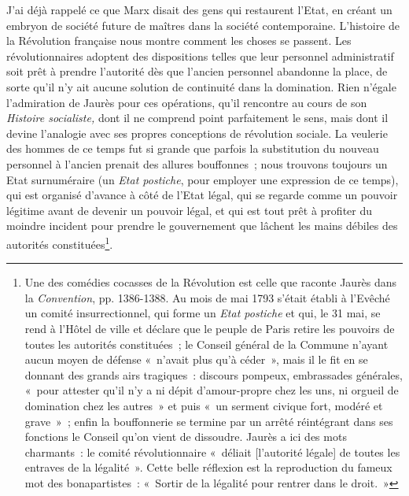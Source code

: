 \documentclass[french,twoside]{book} %
\begin{document}
J’ai déjà rappelé ce que Marx disait des gens qui restaurent l’Etat, en créant un embryon de société future de maîtres dans la société contemporaine. L’histoire de la Révolution française nous montre comment les choses se passent. Les révolutionnaires adoptent des dispositions telles que leur personnel administratif soit prêt à prendre l’autorité dès que l’ancien personnel abandonne la place, de sorte qu’il n’y ait aucune solution de continuité dans la domination. Rien n’égale l’admiration de Jaurès pour ces opérations, qu’il rencontre au cours de son \emph{Histoire socialiste,} dont il ne comprend point parfaitement le sens, mais dont il devine l’analogie avec ses propres conceptions de révolution sociale. La veulerie des hommes de ce temps fut si grande que parfois la substitution du nouveau personnel à l’ancien prenait des allures bouffonnes ; nous trouvons toujours un Etat surnuméraire (un \emph{Etat postiche}, pour employer une expression de ce temps), qui est organisé d’avance à côté  de l’Etat légal, qui se regarde comme un pouvoir légitime avant de devenir un pouvoir légal, et qui est tout prêt à profiter du moindre incident pour prendre le gouvernement que lâchent les mains débiles des autorités constituées\footnote{ \noindent Une des comédies cocasses de la Révolution est celle que raconte Jaurès dans la \emph{Convention}, pp. 1386-1388. Au mois de mai 1793 s’était établi à l’Evêché un comité insurrectionnel, qui forme un \emph{Etat postiche} et qui, le 31 mai, se rend à l’Hôtel de ville et déclare que le peuple de Paris retire les pouvoirs de toutes les autorités constituées ; le Conseil général de la Commune n’ayant aucun moyen de défense « n’avait plus qu’à céder », mais il le fit en se donnant des grands airs tragiques : discours pompeux, embrassades générales, « pour attester qu’il n’y a ni dépit d’amour-propre chez les uns, ni orgueil de domination chez les autres » et puis « un serment civique fort, modéré et grave » ; enfin la bouffonnerie se termine par un arrêté réintégrant dans ses fonctions le Conseil qu’on vient de dissoudre. Jaurès a ici des mots charmants : le comité révolutionnaire « déliait [l’autorité légale] de toutes les entraves de la légalité ». Cette belle réflexion est la reproduction du fameux mot des bonapartistes : « Sortir de la légalité pour rentrer dans le droit. »
 }.\par
\end{document}
